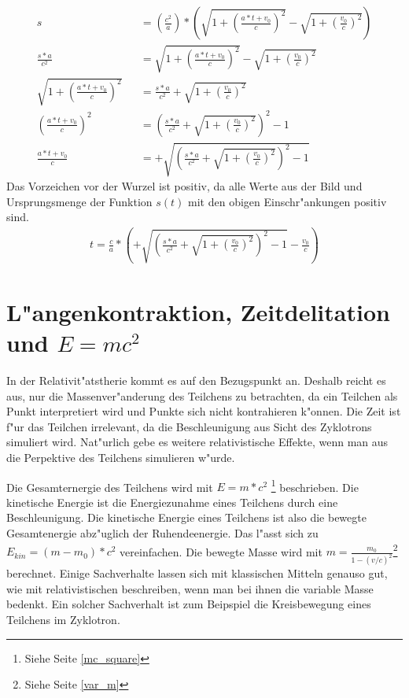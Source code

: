 \documentclass[14pt, a4paper]{report}
\begin{document}
\begin{eqnarray}
s && = \left(\frac{c^2}{a}\right) * \left(\sqrt{1 + \left(\frac{a*t + v_0}{c}\right)^2} - \sqrt{1 + \left(\frac{v_0}{c}\right)^2}\right) \\
\frac{s*a}{c^2}&& = \sqrt{1 + \left(\frac{a*t + v_0}{c}\right)^2} - \sqrt{1 + \left(\frac{v_0}{c}\right)^2}\\
\sqrt{1 + \left(\frac{a*t + v_0}{c}\right)^2} &&= \frac{s*a}{c^2} + \sqrt{1 + \left(\frac{v_0}{c}\right)^2} \\
\left(\frac{a*t + v_0}{c}\right)^2 &&  = \left(\frac{s*a}{c^2} + \sqrt{1 + \left(\frac{v_0}{c}\right)^2}\right)^2 - 1 \\ 
\frac{a*t + v_0}{c} && = +\sqrt{\left(\frac{s*a}{c^2} + \sqrt{1 + \left(\frac{v_0}{c}\right)^2}\right)^2 - 1}
\end{eqnarray}
Das Vorzeichen vor der Wurzel ist positiv, da alle Werte aus der Bild und Ursprungsmenge 
der Funktion $s(t)$ mit den obigen Einschr"ankungen positiv sind.
\begin{eqnarray}
t = \frac{c}{a} * \left( +\sqrt{\left(\frac{s*a}{c^2} + \sqrt{1 + \left(\frac{v_0}{c}\right)^2}\right)^2 - 1} - \frac{v_0}{c}\right)
\end{eqnarray}

\section{L"angenkontraktion, Zeitdelitation und $E=mc^2$}
In der Relativit"atstherie kommt es auf den Bezugspunkt an. Deshalb reicht es aus, nur
die Massenver"anderung des Teilchens zu betrachten, da ein Teilchen als Punkt 
interpretiert wird und Punkte sich nicht kontrahieren k"onnen. Die Zeit ist f"ur das 
Teilchen irrelevant, da die Beschleunigung aus Sicht des Zyklotrons simuliert wird.
Nat"urlich gebe es weitere relativistische Effekte, wenn man aus die Perpektive des 
Teilchens simulieren w"urde.

Die Gesamternergie des Teilchens wird mit $E = m*c^2$ \footnote{Siehe 
Seite \pageref{mc_square} \ref{mc_square}} beschrieben. Die kinetische Energie ist die 
Energiezunahme eines Teilchens durch eine Beschleunigung. Die kinetische Energie eines
Teilchens ist also die bewegte Gesamtenergie abz"uglich der Ruhendeenergie. Das l"asst sich zu 
$E_{kin} = (m-m_0)*c^2$ vereinfachen. Die bewegte Masse wird mit 
$m = \frac{m_0}{1-(v/c)^2}$\footnote{Siehe Seite \pageref{var_m} \ref{var_m}} berechnet.
Einige Sachverhalte lassen sich mit klassischen Mitteln genauso gut, wie mit 
relativistischen beschreiben, wenn man bei ihnen die variable Masse bedenkt. Ein solcher
Sachverhalt ist zum Beipspiel die Kreisbewegung eines Teilchens im Zyklotron.
\end{document}
